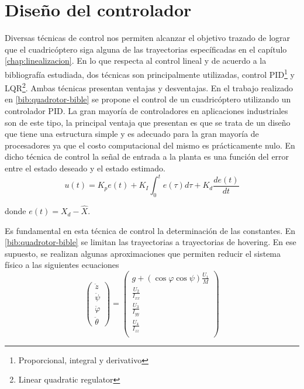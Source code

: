\documentclass[main]{subfiles}
\begin{document}
\chapter{Diseño del controlador}
\label{chap:control}

Diversas técnicas de control nos permiten alcanzar el objetivo trazado de lograr que el cuadric\'optero siga alguna de las trayectorias espec\'ificadas en el cap\'itulo \ref{chap:linealizacion}. En lo que respecta al control lineal y de acuerdo a la bibliograf\'ia estudiada, dos técnicas son principalmente utilizadas, control PID\footnote{Proporcional, integral y derivativo} y LQR\footnote{Linear quadratic regulator}. Ambas t\'ecnicas presentan ventajas y desventajas. En el trabajo realizado en \ref{bib:quadrotor-bible} se propone el control de un cuadric\'optero utilizando un controlador PID. La gran mayoría de controladores en aplicaciones industriales son de este tipo, la principal ventaja que presentan es que se trata de un diseño que tiene una estructura simple y es adecuado para la gran mayoría de procesadores ya que el costo computacional del mismo es prácticamente nulo. En dicho t\'ecnica de control la señal de entrada a la planta es una funci\'on del error entre el estado deseado y el estado estimado.
\begin{equation}
u(t) = K_pe(t)+K_I\int_0^t e(\tau) d\tau +K_d\frac{de(t)}{dt}
\end{equation}

donde $e(t) = X_d-\hat{X}$.

Es fundamental en esta t\'ecnica de control la determinaci\'on de las constantes. En \ref{bib:quadrotor-bible} se limitan las trayectorias a trayectorias de hovering. En ese supuesto, se realizan algunas aproximaciones que permiten reducir el sistema f\'isico a las siguientes ecuaciones
\begin{equation}
\left(
\begin{array}{c}
\ddot{z}\\
\ddot{\psi}\\
\ddot{\varphi} \\
\ddot{\theta}
\end{array}\right)
=\left(\begin{array}{c}
g+(\cos\varphi\cos\psi)\frac{U_1}{M}\\
 \frac{U_2}{I_{xx}} \\
 \frac{U_3}{I_{yy}} \\
 \frac{U_4}{I_{zz}} \\
\end{array}\right)
\end{equation}
\end{document}
